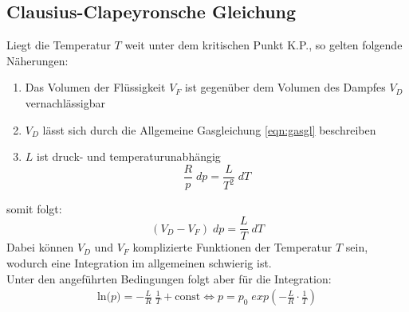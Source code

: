 \subsection{Clausius-Clapeyronsche Gleichung}
Liegt die Temperatur $T$ weit unter dem kritischen Punkt K.P., so gelten folgende Näherungen:
\begin{enumerate}
    \item Das Volumen der Flüssigkeit $V_F$ ist gegenüber dem Volumen des Dampfes $V_D$ vernachlässigbar
    \item $V_D$ lässt sich durch die Allgemeine Gasgleichung \ref{eqn:gasgl} beschreiben
    \item $L$ ist druck- und temperaturunabhängig
    \begin{equation}
        \frac{R}{p}\;dp=\frac{L}{T^2}\;dT
    \end{equation}
\end{enumerate}
somit folgt:
\begin{equation}
    (V_D-V_F)\;dp=\frac{L}{T}\;dT
\end{equation}
Dabei können $V_D$ und $V_F$ komplizierte Funktionen der Temperatur $T$ sein, wodurch eine 
Integration im allgemeinen schwierig ist.\\
Unter den angeführten Bedingungen folgt aber für die Integration:
\begin{gather}
    \textrm{ln($p$)} = -\frac{L}{R}\;\frac{1}{T}+\textrm{const}
   \Longleftrightarrow p=p_0\;exp(-\frac{L}{R}\cdot \frac{1}{T})
\end{gather}